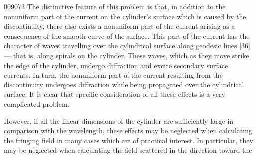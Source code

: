 \begin{scanpage}{0090}{73}
The distinctive feature of this problem is that, in addition to the nonuniform part of the current on the cylinder's surface which is caused by the discontinuity, there also exists a nonuniform part of the current arising as a consequence of the smooth curve of the surface. This part of the current has the character of waves travelling over the cylindrical surface along geodesic lines [36] --- that is, along spirals on the cylinder. These waves, which as they move strike the edge of the cylinder, undergo diffraction and excite secondary surface currents. In turn, the nonuniform part of the current resulting from the discontinuity undergoes diffraction while being propagated over the cylindrical surface. It is clear that specific consideration of all these effects is a very complicated problem.

However, if all the linear dimensions of the cylinder are sufficiently large in comparison with the wavelength, these effects may be neglected when calculating the fringing field in many cases which are of practical interest. In particular, they may be neglected when calculating the field scattered in the direction toward the
\end{scanpage}
